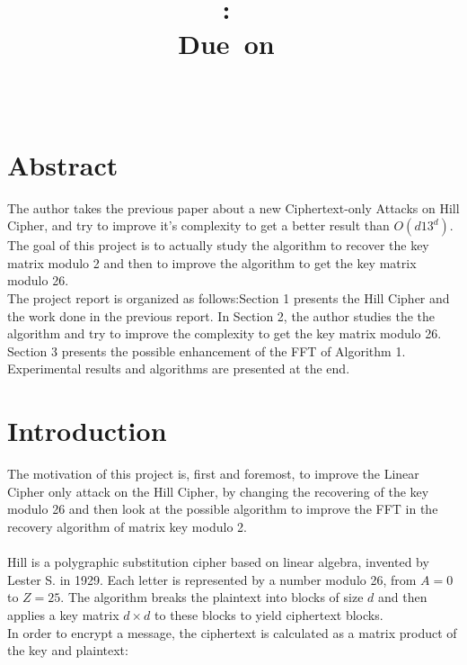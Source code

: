 \documentclass{article}
\title{
\logoepfl
\vspace{2in}
\textmd{\textbf{\hmwkClass:\ \hmwkTitle}}\\
\normalsize\vspace{0.1in}\small{Due\ on\ \hmwkDueDate}\\
\vspace{0.1in}\large{\textit{\hmwkClassInstructor\ \hmwkClassTime}}
\author{\textbf{\hmwkAuthorName}}
\vspace{3in}
\logolasec
}
\begin{document}
\maketitle

\newpage
\section*{Abstract}
The author takes the previous paper about a new Ciphertext-only Attacks on Hill Cipher, and try to improve it's complexity to get a better result than $O(d13^d)$.\\
${}$\hspace{1em}The goal of this project is to actually study the algorithm to recover the key matrix modulo 2 and then to improve the algorithm to get the key matrix modulo 26.\\
${}$\hspace{1em}The project report is organized as follows:Section 1 presents the Hill Cipher and the work done in the previous report. In Section 2, the author studies the the algorithm and try to improve the complexity to get the key matrix modulo 26. Section 3 presents the possible enhancement of the FFT of Algorithm 1. Experimental results and algorithms are presented at the end.

\newpage
\tableofcontents
\newpage



\section{Introduction}
The motivation of this project is, first and foremost, to improve the Linear Cipher only attack on the Hill Cipher, by changing the recovering of the key modulo 26 and then look at the possible algorithm to improve the FFT in the recovery algorithm of matrix key modulo 2.\\
\\
Hill is a polygraphic substitution cipher based on linear algebra, invented by Lester S. in 1929. Each letter is represented by a number modulo 26, from $A=0$ to $Z=25$. The algorithm breaks the plaintext into blocks of size $d$ and then applies a key matrix $d \times d $ to these blocks to yield ciphertext blocks.\\
In order to encrypt a message, the ciphertext is calculated as a matrix product of the key and plaintext:
\end{document}
